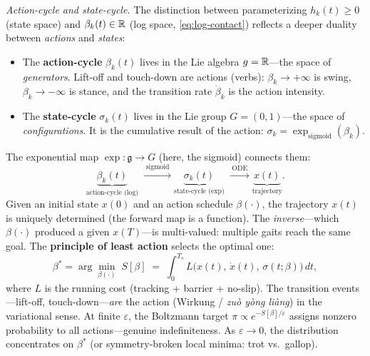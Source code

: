 \medskip\noindent\emph{Action-cycle and state-cycle.}
The distinction between parameterizing $h_k(t) \geq 0$ (state space)
and $\beta_k(t) \in \mathbb{R}$ (log space, \eqref{eq:log-contact}) reflects a
deeper duality between \emph{actions} and \emph{states}:
\begin{itemize}[nosep]
\item The \textbf{action-cycle} $\beta_k(t)$ lives in the Lie algebra
  $g = \mathbb{R}$---the space of \emph{generators}.
  Lift-off and touch-down are actions (verbs): $\beta_k \to +\infty$
  is swing, $\beta_k \to -\infty$ is stance, and the transition rate
  $\dot{\beta}_k$ is the action intensity.
\item The \textbf{state-cycle} $\sigma_k(t)$ lives in the Lie group
  $G = (0,1)$---the space of \emph{configurations}.
  It is the cumulative result of the action:
  $\sigma_k = \exp_{\mathrm{sigmoid}}(\beta_k)$.
\end{itemize}
The exponential map $\exp: \mathfrak{g} \to G$ (here, the sigmoid)
connects them:
\begin{equation}\label{eq:action-state}
  \underbrace{\beta_k(t)}_{\text{action-cycle (log)}}
  \;\xrightarrow{\;\mathrm{sigmoid}\;}
  \underbrace{\sigma_k(t)}_{\text{state-cycle (exp)}}
  \;\xrightarrow{\;\text{ODE}\;}
  \underbrace{x(t)}_{\text{trajectory}}.
\end{equation}
Given an initial state $x(0)$ and an action schedule $\beta(\cdot)$,
the trajectory $x(t)$ is uniquely determined (the forward map is a
function).
The \emph{inverse}---which $\beta(\cdot)$ produced a given $x(T)$---is
multi-valued: multiple gaits reach the same goal.
The \textbf{principle of least action} selects the optimal one:
\begin{equation}\label{eq:least-action}
  \beta^* = \arg\min_{\beta(\cdot)} \;
  S[\beta] \;=\; \int_0^{T_s} L\bigl(x(t),\, \dot{x}(t),\,
    \sigma(t;\beta)\bigr)\, dt,
\end{equation}
where $L$ is the running cost (tracking + barrier + no-slip).
The transition events---lift-off, touch-down---\emph{are} the action
(Wirkung / \emph{zu\`o y\`ong li\`ang}) in the variational sense.
At finite $\varepsilon$, the Boltzmann target
$\pi \propto e^{-S[\beta]/\varepsilon}$ assigns nonzero probability to all
actions---genuine indefiniteness.
As $\varepsilon \to 0$, the distribution concentrates on $\beta^*$
(or symmetry-broken local minima: trot vs.\ gallop).

